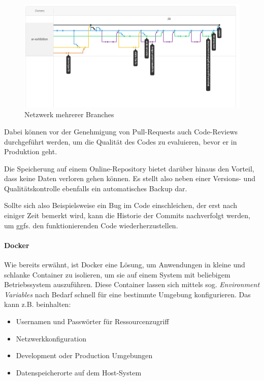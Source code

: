 \documentclass[titlepage, a4paper, 11pt]{scrartcl}
\begin{document}
          \begin{figure}[H]
            \centering
            \includegraphics[width=.8\textwidth]{gitBranches.PNG}
            \caption{Netzwerk mehrerer Branches}
            \label{GitNetworks}
          \end{figure}
          
          Dabei können vor der Genehmigung von Pull-Requests auch Code-Reviews durchgeführt werden, um die Qualität des Codes zu evaluieren,
          bevor er in Produktion geht.
          
          Die Speicherung auf einem Online-Repository bietet darüber hinaus den Vorteil, dass keine Daten verloren gehen können.
          Es stellt also neben einer Versions- und Qualitätskontrolle ebenfalls ein automatisches Backup dar.

          Sollte sich also Beispielsweise ein Bug im Code einschleichen, der erst nach einiger Zeit bemerkt wird, kann die Historie
          der Commits nachverfolgt werden, um ggfs. den funktionierenden Code wiederherzustellen.

        \paragraph{Docker}

          Wie bereits erwähnt, ist Docker eine Lösung, um Anwendungen in kleine und schlanke Container zu isolieren, um sie auf einem System mit beliebigem 
          Betriebssystem auszuführen. Diese Container lassen sich mittels sog. \textit{Environment Variables} nach Bedarf schnell für eine bestimmte Umgebung konfigurieren.
          Das kann z.B. beinhalten:

          \begin{itemize}
            \item Usernamen und Passwörter für Ressourcenzugriff
            \item Netzwerkkonfiguration
            \item Development oder Production Umgebungen
            \item Datenspeicherorte auf dem Host-System
          \end{itemize}
\end{document}

